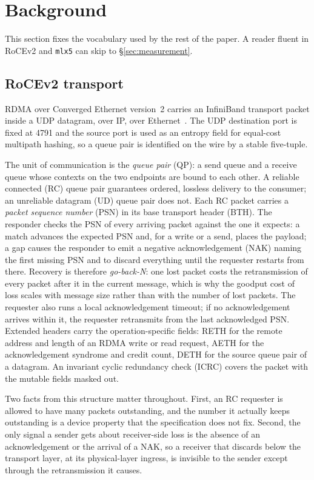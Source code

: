 \section{Background}
\label{sec:bg}

This section fixes the vocabulary used by the rest of the paper. A reader
fluent in RoCEv2 and \texttt{mlx5} can skip to \S\ref{sec:measurement}.

\subsection{RoCEv2 transport}

RDMA over Converged Ethernet version~2 carries an InfiniBand transport packet
inside a UDP datagram, over IP, over Ethernet~\cite{ibta-a17}. The UDP
destination port is fixed at 4791 and the source port is used as an
entropy field for equal-cost multipath hashing, so a queue pair is identified
on the wire by a stable five-tuple.

The unit of communication is the \emph{queue pair} (QP): a send queue and a
receive queue whose contexts on the two endpoints are bound to each other. A
reliable connected (RC) queue pair guarantees ordered, lossless delivery to the
consumer; an unreliable datagram (UD) queue pair does not. Each RC packet
carries a \emph{packet sequence number} (PSN) in its base transport header
(BTH). The responder checks the PSN of every arriving packet against the one it
expects: a match advances the expected PSN and, for a write or a send, places
the payload; a gap causes the responder to emit a negative acknowledgement
(NAK) naming the first missing PSN and to discard everything until the
requester restarts from there. Recovery is therefore \emph{go-back-N}: one lost
packet costs the retransmission of every packet after it in the current
message, which is why the goodput cost of loss scales with message size rather
than with the number of lost packets. The requester also runs a local
acknowledgement timeout; if no acknowledgement arrives within it, the requester
retransmits from the last acknowledged PSN. Extended headers carry the
operation-specific fields: RETH for the remote address and length of an RDMA
write or read request, AETH for the acknowledgement syndrome and credit count,
DETH for the source queue pair of a datagram. An invariant cyclic redundancy
check (ICRC) covers the packet with the mutable fields masked out.

Two facts from this structure matter throughout. First, an RC requester is
allowed to have many packets outstanding, and the number it actually keeps
outstanding is a device property that the specification does not fix. Second,
the only signal a sender gets about receiver-side loss is the absence of an
acknowledgement or the arrival of a NAK, so a receiver that discards below the
transport layer, at its physical-layer ingress, is invisible to the sender
except through the retransmission it causes.

